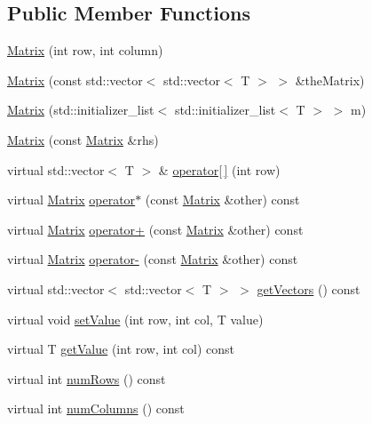 \subsection*{Public Member Functions}
\begin{DoxyCompactItemize}
\item 
\hyperlink{class_alg_lib_1_1_matrix_aa928f1b4f97f3689739fb76f37ea8b32}{Matrix} (int row, int column)
\item 
\hyperlink{class_alg_lib_1_1_matrix_ae5fe940d778538e4e9b92e559d4892f9}{Matrix} (const std\+::vector$<$ std\+::vector$<$ T $>$ $>$ \&the\+Matrix)
\item 
\hyperlink{class_alg_lib_1_1_matrix_a3c8f9c4d2a7a1d6235e364081c7b2291}{Matrix} (std\+::initializer\+\_\+list$<$ std\+::initializer\+\_\+list$<$ T $>$ $>$ m)
\item 
\hyperlink{class_alg_lib_1_1_matrix_af032730ee4314ca530b7926441135377}{Matrix} (const \hyperlink{class_alg_lib_1_1_matrix}{Matrix} \&rhs)
\item 
virtual std\+::vector$<$ T $>$ \& \hyperlink{class_alg_lib_1_1_matrix_aad964932a50c21c7b6f49f5193f42b3c}{operator\mbox{[}$\,$\mbox{]}} (int row)
\item 
virtual \hyperlink{class_alg_lib_1_1_matrix}{Matrix} \hyperlink{class_alg_lib_1_1_matrix_abd934caac0e4025576d38f2b9ebc85d0}{operator$\ast$} (const \hyperlink{class_alg_lib_1_1_matrix}{Matrix} \&other) const 
\item 
virtual \hyperlink{class_alg_lib_1_1_matrix}{Matrix} \hyperlink{class_alg_lib_1_1_matrix_ac85ab14586f80045033981c7751fd124}{operator+} (const \hyperlink{class_alg_lib_1_1_matrix}{Matrix} \&other) const 
\item 
virtual \hyperlink{class_alg_lib_1_1_matrix}{Matrix} \hyperlink{class_alg_lib_1_1_matrix_ae947b17fc992a714c6fc5dfa7365deb8}{operator-\/} (const \hyperlink{class_alg_lib_1_1_matrix}{Matrix} \&other) const 
\item 
virtual std\+::vector$<$ std\+::vector$<$ T $>$ $>$ \hyperlink{class_alg_lib_1_1_matrix_a5c651bc81f24c02ccbee007f4be49dfa}{get\+Vectors} () const 
\item 
virtual void \hyperlink{class_alg_lib_1_1_matrix_a434ac30c8fe0674d740ab8e513318cae}{set\+Value} (int row, int col, T value)
\item 
virtual T \hyperlink{class_alg_lib_1_1_matrix_a99342d63d4ed38c0289f14566381958e}{get\+Value} (int row, int col) const 
\item 
virtual int \hyperlink{class_alg_lib_1_1_matrix_ae78e1e7470110c5d8e43fe1199c6540e}{num\+Rows} () const 
\item 
virtual int \hyperlink{class_alg_lib_1_1_matrix_ac9a4892052b6d988fc79390528122f00}{num\+Columns} () const 
\end{DoxyCompactItemize}
